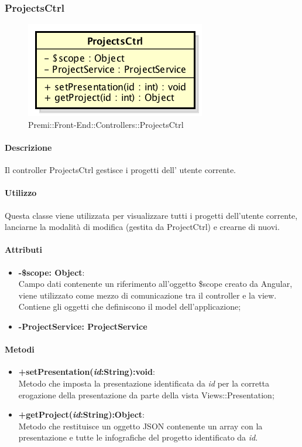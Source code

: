 \newpage
\subsubsection{ProjectsCtrl}
\begin{figure}[h]
	\centering
	\includegraphics[width=0.4\linewidth]{img/premi_front_end_controllers_projectsctrl}
	\caption[Premi::Front-End::Controllers::ProjectsCtrl]{Premi::Front-End::Controllers::ProjectsCtrl}
\end{figure}
	\paragraph{Descrizione}
	Il controller ProjectsCtrl gestisce i progetti dell' utente corrente.

	\paragraph{Utilizzo}
	Questa classe viene utilizzata per visualizzare tutti i progetti dell'utente corrente, lanciarne la modalità di modifica (gestita da ProjectCtrl) e crearne di nuovi.\\
	\paragraph{Attributi}
	\begin{itemize}
		\item \textbf{-\$scope: Object}:\\
			Campo dati contenente un riferimento all'oggetto \$scope creato da Angular, viene utilizzato come mezzo di comunicazione tra il controller e la view. Contiene gli oggetti che definiscono il model dell'applicazione;
		\item \textbf{-ProjectService: ProjectService}
	\end{itemize}

	\paragraph{Metodi}
	\begin{itemize}
	  \item \textbf{+setPresentation(\textit{id}:String):void}:\\
		  Metodo che imposta la presentazione identificata da  \textit{id} per la corretta erogazione della presentazione da parte della vista Views::Presentation;
	  \item \textbf{+getProject(\textit{id}:String):Object}:\\
		  Metodo che restituisce un oggetto JSON contenente un array con la presentazione e tutte le infografiche del progetto identificato da \textit{id}.

	\end{itemize}

